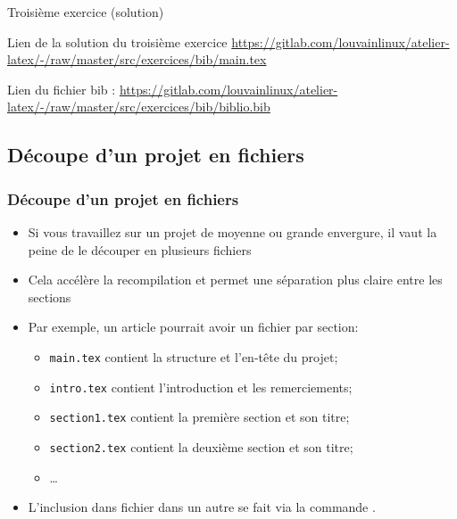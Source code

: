 \begin{frame}[fragile]{Troisième exercice (solution)}
  \begin{center}
  Lien de la solution du troisième exercice \url{https://gitlab.com/louvainlinux/atelier-latex/-/raw/master/src/exercices/bib/main.tex}


  Lien du fichier bib : \url{https://gitlab.com/louvainlinux/atelier-latex/-/raw/master/src/exercices/bib/biblio.bib}
  \end{center}
\end{frame}

\subsection{Découpe d'un projet en fichiers}

\begin{frame}[fragile]
  \frametitle{\Warning Découpe d'un projet en fichiers}
  \begin{itemize}
    \item Si vous travaillez sur un projet de moyenne ou grande envergure, il vaut la peine de le découper en plusieurs fichiers
    \item Cela accélère la recompilation et permet une séparation plus claire entre les sections
    \item Par exemple, un article pourrait avoir un fichier par section:
    \begin{itemize}
      \item \texttt{main.tex} contient la structure et l'en-tête du projet;
      \item \texttt{intro.tex} contient l'introduction et les remerciements;
      \item \texttt{section1.tex} contient la première section et son titre;
      \item \texttt{section2.tex} contient la deuxième section et son titre;
      \item \dots
    \end{itemize}
    \item L'inclusion dans fichier dans un autre se fait via la commande \lstinline||.
  \end{itemize}
\end{frame}

